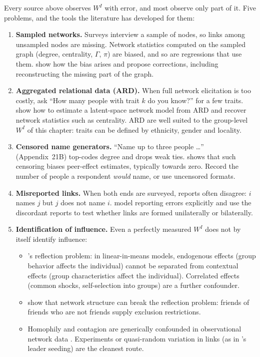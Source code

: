 \documentclass[../structural_economics_book.tex]{subfiles}
\begin{document}
Every source above observes $W^I$ with error, and most observe only part of it. Five problems, and the tools the literature has developed for them:

\begin{enumerate}
\item \textbf{Sampled networks.} Surveys interview a sample of nodes, so links among unsampled nodes are missing. Network statistics computed on the sampled graph (degree, centrality, $\Gamma$, $\pi$) are biased, and so are regressions that use them. \citet{chandrasekhar2016econometrics} show how the bias arises and propose corrections, including reconstructing the missing part of the graph.
\item \textbf{Aggregated relational data (ARD).} When full network elicitation is too costly, ask ``How many people with trait $k$ do you know?'' for a few traits. \citet*{breza2020using} show how to estimate a latent-space network model from ARD and recover network statistics such as centrality. ARD are well suited to the group-level $W^I$ of this chapter: traits can be defined by ethnicity, gender and locality.
\item \textbf{Censored name generators.} ``Name up to three people \ldots'' (Appendix~21B) top-codes degree and drops weak ties. \citet{griffith2022name} shows that such censoring biases peer-effect estimates, typically towards zero. Record the number of people a respondent \emph{would} name, or use uncensored formats.
\item \textbf{Misreported links.} When both ends are surveyed, reports often disagree: $i$ names $j$ but $j$ does not name $i$. \citet{comola2014testing} model reporting errors explicitly and use the discordant reports to test whether links are formed unilaterally or bilaterally.
\item \textbf{Identification of influence.} Even a perfectly measured $W^I$ does not by itself identify influence:
\begin{itemize}
\item \citeauthor{manski1993identification}'s \citeyearpar{manski1993identification} reflection problem: in linear-in-means models, endogenous effects (group behavior affects the individual) cannot be separated from contextual effects (group characteristics affect the individual). Correlated effects (common shocks, self-selection into groups) are a further confounder.
\item \citet*{bramoulle2009identification} show that network structure can break the reflection problem: friends of friends who are not friends supply exclusion restrictions.
\item Homophily and contagion are generically confounded in observational network data \citep{shalizi2011homophily}. Experiments or quasi-random variation in links (as in \citeauthor{banerjee2013diffusion}'s leader seeding) are the cleanest route.
\end{itemize}
\end{enumerate}
\end{document}
